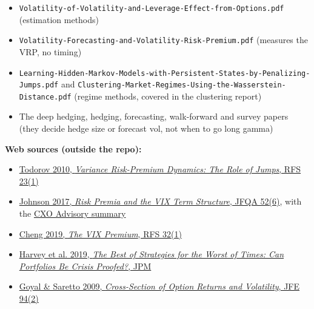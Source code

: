 \documentclass{article}
\begin{document}
\begin{itemize}

\item \texttt{Volatility-\allowbreak{}of-\allowbreak{}Volatility-\allowbreak{}and-\allowbreak{}Leverage-\allowbreak{}Effect-\allowbreak{}from-\allowbreak{}Options.\allowbreak{}pdf} (estimation methods)

\item \texttt{Volatility-\allowbreak{}Forecasting-\allowbreak{}and-\allowbreak{}Volatility-\allowbreak{}Risk-\allowbreak{}Premium.\allowbreak{}pdf} (measures the VRP, no timing)

\item \texttt{Learning-\allowbreak{}Hidden-\allowbreak{}Markov-\allowbreak{}Models-\allowbreak{}with-\allowbreak{}Persistent-\allowbreak{}States-\allowbreak{}by-\allowbreak{}Penalizing-\allowbreak{}Jumps.\allowbreak{}pdf} and \texttt{Clustering-\allowbreak{}Market-\allowbreak{}Regimes-\allowbreak{}Using-\allowbreak{}the-\allowbreak{}Wasserstein-\allowbreak{}Distance.\allowbreak{}pdf} (regime methods, covered in the clustering report)

\item The deep hedging, hedging, forecasting, walk-forward and survey papers (they decide hedge size or forecast vol, not when to go long gamma)

\end{itemize}

\textbf{Web sources (outside the repo):}

\begin{itemize}

\item \href{https://ideas.repec.org/a/oup/rfinst/v23y2010i1p345-383.html}{Todorov 2010, \emph{Variance Risk-Premium Dynamics: The Role of Jumps}, RFS 23(1)}

\item \href{https://ideas.repec.org/a/cup/jfinqa/v52y2017i06p2461-2490_00.html}{Johnson 2017, \emph{Risk Premia and the VIX Term Structure}, JFQA 52(6)}, with the \href{https://www.cxoadvisory.com/volatility-effects/vix-term-structure-slope-and-variance-asset-future-returns/}{CXO Advisory summary}

\item \href{https://ideas.repec.org/a/oup/rfinst/v32y2019i1p180-227..html}{Cheng 2019, \emph{The VIX Premium}, RFS 32(1)}

\item \href{https://people.duke.edu/~charvey/Research/Published_Papers/P140_The_best_of.pdf}{Harvey et al. 2019, \emph{The Best of Strategies for the Worst of Times: Can Portfolios Be Crisis Proofed?}, JPM}

\item \href{https://ideas.repec.org/a/eee/jfinec/v94y2009i2p310-326.html}{Goyal \& Saretto 2009, \emph{Cross-Section of Option Returns and Volatility}, JFE 94(2)}

\end{itemize}
\end{document}
